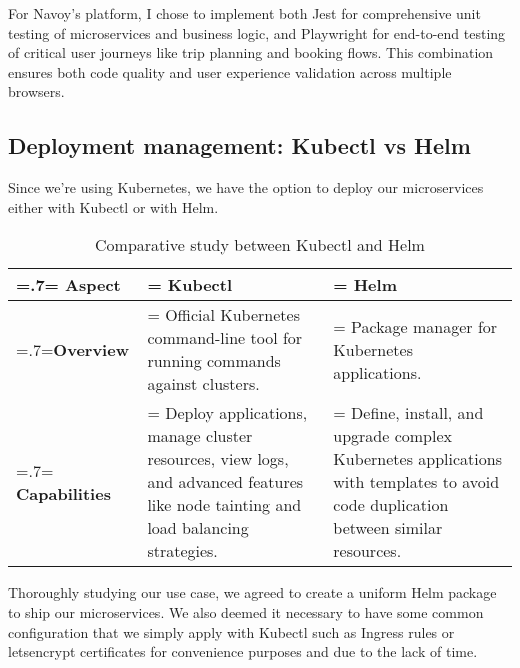 For Navoy's platform, I chose to implement both Jest for comprehensive unit testing of microservices and business logic, and Playwright for end-to-end testing of critical user journeys like trip planning and booking flows. This combination ensures both code quality and user experience validation across multiple browsers.

\subsection{Deployment management: Kubectl vs Helm}
Since we're using Kubernetes, we have the option to deploy our microservices either with Kubectl or with Helm.
\begin{table}[H]
    \renewcommand{\arraystretch}{1.5}%
    \caption{Comparative study between Kubectl and Helm}
    \centering
    \medskip
    \begin{tabularx}{1\textwidth} {
            | >{\hsize=.7\hsize\linewidth=\hsize\centering\arraybackslash}X
            | >{\hsize=1.15\hsize\linewidth=\hsize\justifying\arraybackslash}X
            | >{\hsize=1.15\hsize\linewidth=\hsize\justifying\arraybackslash}X |}
        \hline
        \rowcolor{primary} \textbf {Aspect} & \textbf{Kubectl}                                                                                                                            & \textbf{Helm}                                                                                                                              \\
        \hline
        \textbf {Overview}                  & \noindent Official Kubernetes command-line tool for running commands against clusters.                                                      & \noindent Package manager for Kubernetes applications.                                                                                     \\
        \hline
        \textbf {Capabilities}              & \noindent Deploy applications, manage cluster resources, view logs, and advanced features like node tainting and load balancing strategies. & \noindent Define, install, and upgrade complex Kubernetes applications with templates to avoid code duplication between similar resources. \\
        \hline
    \end{tabularx}
\end{table}
Thoroughly studying our use case, we agreed to create a uniform Helm package to ship our microservices.
We also deemed it necessary to have some common configuration that we simply apply with Kubectl such as Ingress rules or letsencrypt certificates for convenience purposes and due to the lack of time.

